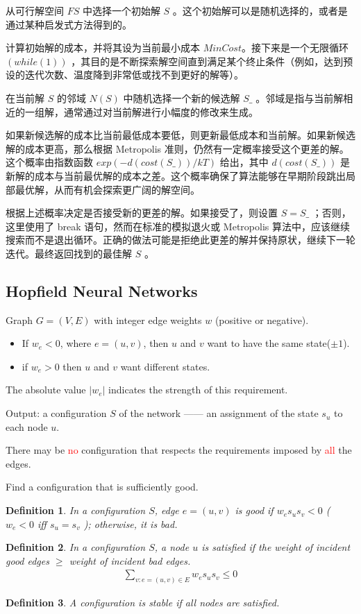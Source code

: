 \documentclass{article}
\newtheorem*{Definition}{Definition}
\begin{document}
从可行解空间 $FS$ 中选择一个初始解 $S$ 。这个初始解可以是随机选择的，或者是通过某种启发式方法得到的。

计算初始解的成本，并将其设为当前最小成本 $MinCost$。接下来是一个无限循环 $(while (1))$ ，其目的是不断探索解空间直到满足某个终止条件（例如，达到预设的迭代次数、温度降到非常低或找不到更好的解等）。

在当前解 $S$ 的邻域 $N(S)$ 中随机选择一个新的候选解 $S\_$ 。邻域是指与当前解相近的一组解，通常通过对当前解进行小幅度的修改来生成。

如果新候选解的成本比当前最低成本要低，则更新最低成本和当前解。如果新候选解的成本更高，那么根据 Metropolis 准则，仍然有一定概率接受这个更差的解。这个概率由指数函数 $exp(-d(cost(S\_))/kT)$ 给出，其中 $d(cost(S\_))$ 是新解的成本与当前最优解的成本之差。这个概率确保了算法能够在早期阶段跳出局部最优解，从而有机会探索更广阔的解空间。

根据上述概率决定是否接受新的更差的解。如果接受了，则设置 $S = S\_$ ；否则，这里使用了 break 语句，然而在标准的模拟退火或 Metropolis 算法中，应该继续搜索而不是退出循环。正确的做法可能是拒绝此更差的解并保持原状，继续下一轮迭代。最终返回找到的最佳解 $S$ 。

\subsection{Hopfield Neural Networks}
Graph $G = (V, E)$ with integer edge weights $w$ (positive or negative).
\begin{itemize}
    \item If $w_e < 0$, where $e = (u, v)$, then $u$ and $v$ want to have the same state($\pm 1$). 
    \item if $w_e > 0$ then $u$ and $v$ want different states.
\end{itemize}

The absolute value $|w_e|$ indicates the strength of this requirement.

Output: a configuration $S$ of the network —— an assignment of the state $s_u$ to each node $u$. 

There may be \textcolor{red}{no} configuration that respects the requirements imposed by \textcolor{red}{all} the edges.

Find a configuration that is sufficiently good.

\begin{Definition}
    In a configuration $S$, edge $e = (u, v)$ is good if $w_e s_u s_v < 0$ ($w_e < 0$ iff $s_u = s_v$ ); otherwise, it is bad.
\end{Definition}
\begin{Definition}
    In a configuration $S$, a node $u$ is satisfied if the weight of incident good edges $\ge$ weight of incident bad edges.
    \begin{align*}
        \sum_{v:e=(u,v)\in E}w_es_us_v\le 0
    \end{align*}
\end{Definition}
\begin{Definition}
    A configuration is stable if all nodes are satisfied. 
\end{Definition}
\end{document}
